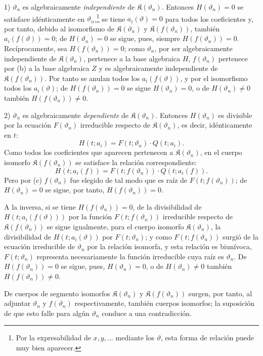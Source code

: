 \documentclass[11pt]{article}
\begin{document}
1) $\vartheta_n$ es algebraicamente \emph{independiente} de $\mathfrak K(\vartheta_n)$. Entonces $H(\vartheta_n)=0$ se satisface idénticamente en $\vartheta_n$,\footnote{Por la expresabilidad de $x,y,\ldots$ mediante los $\vartheta$, esta forma de relación puede muy bien aparecer.} se tiene $a_i(\vartheta)=0$ para todos los coeficientes y, por tanto, debido al isomorfismo de $\mathfrak K(\vartheta_n)$ y $\mathfrak K(f(\vartheta_n))$, también $a_i(f(\vartheta))=0$; de $H(\vartheta_n)=0$ se sigue, pues, siempre $H(f(\vartheta_n))=0$. Recíprocamente, sea $H(f(\vartheta_n))=0$; como $\vartheta_n$, por ser algebraicamente independiente de $\mathfrak K(\vartheta_n)$, pertenece a la base algebraica $H$, $f(\vartheta_n)$ pertenece por (b) a la base algebraica $Z$ y es algebraicamente independiente de $\mathfrak K(f(\vartheta_n))$. Por tanto se anulan todos los $a_i(f(\vartheta))$, y por el isomorfismo todos los $a_i(\vartheta)$; de $H(f(\vartheta_n))=0$ se sigue $H(\vartheta_n)=0$, o de $H(\vartheta_n)\ne0$ también $H(f(\vartheta_n))\ne0$.

2) $\vartheta_n$ es algebraicamente \emph{dependiente} de $\mathfrak K(\vartheta_n)$. Entonces $H(\vartheta_n)$ es divisible por la ecuación $F(\vartheta_n)$ irreducible respecto de $\mathfrak K(\vartheta_n)$, es decir, idénticamente en $t$:
\[
H(t;a_i)=F(t;\vartheta_n)\cdot Q(t;a_i).
\]
Como todos los coeficientes que aparecen pertenecen a $\mathfrak K(\vartheta_n)$, en el cuerpo isomorfo $\mathfrak K(f(\vartheta_n))$ se satisface la relación correspondiente:
\[
H(t;a_i(f))=F(t;f(\vartheta_n))\cdot Q(t;a_i(f)).
\]
Pero por (c) $f(\vartheta_n)$ fue elegido de tal modo que es raíz de $F(t;f(\vartheta_n))$; de $H(\vartheta_n)=0$ se sigue, por tanto, $H(f(\vartheta_n))=0$.

A la inversa, si se tiene $H(f(\vartheta_n))=0$, de la divisibilidad de $H(t;a_i(f(\vartheta)))$ por la función $F(t;f(\vartheta_n))$ irreducible respecto de $\mathfrak K(f(\vartheta_n))$ se sigue igualmente, para el cuerpo isomorfo $\mathfrak K(\vartheta_n)$, la divisibilidad de $H(t;a_i(\vartheta))$ por $F(t;\vartheta_n)$; y como $F(t;f(\vartheta_n))$ surgió de la ecuación irreducible de $\vartheta_n$ por la relación isomorfa, y esta relación es biunívoca, $F(t;\vartheta_n)$ representa necesariamente la función irreducible cuya raíz es $\vartheta_n$. De $H(f(\vartheta_n))=0$ se sigue, pues, $H(\vartheta_n)=0$, o de $H(\vartheta_n)\ne0$ también $H(f(\vartheta_n))\ne0$.

De cuerpos de segmento isomorfos $\mathfrak K(\vartheta_n)$ y $\mathfrak K(f(\vartheta_n))$ surgen, por tanto, al adjuntar $\vartheta_n$ y $f(\vartheta_n)$ respectivamente, también cuerpos isomorfos; la suposición de que esto falle para algún $\vartheta_n$ conduce a una contradicción.
\end{document}
